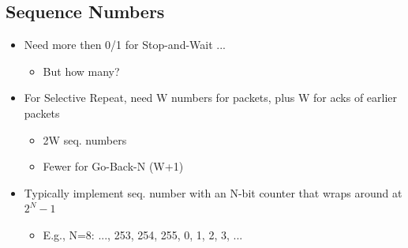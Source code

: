 \documentclass[12pt]{ctexart}   %
\begin{document}
	\subsection{Sequence Numbers}
	\begin{itemize}
		\item Need more then 0/1 for Stop-and-Wait ...
		\begin{itemize}
			\item But how many?
		\end{itemize}
		
		\item For Selective Repeat, need W numbers for packets, plus W for acks of earlier packets
		\begin{itemize}
			\item 2W seq. numbers
			\item Fewer for Go-Back-N (W+1)
		\end{itemize}
		
		\item Typically implement seq. number with an N-bit counter that wraps around at $2^{N} - 1$
		\begin{itemize}
			\item E.g., N=8: ..., 253, 254, 255, 0, 1, 2, 3, ...
		\end{itemize}
	\end{itemize}
	
\end{document}
